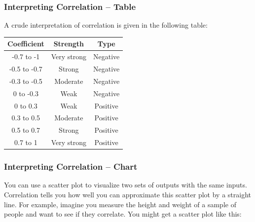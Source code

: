 \documentclass[aspectratio=169,11pt,svgnames,handout]{beamer}
\begin{document}
\begin{frame}
 \frametitle{Interpreting Correlation -- Table}
 A crude interpretation of correlation is given in the following table:
 \begin{center}
  \begin{tabular}{ccc}
   \textbf{Coefficient} & \textbf{Strength} & \textbf{Type} \\
   \toprule
   -0.7 to -1 & Very strong & Negative\\
   -0.5 to -0.7 & Strong & Negative\\
   -0.3 to -0.5 & Moderate & Negative\\
   0 to -0.3 & Weak & Negative\\
   0 to 0.3 & Weak & Positive\\
   0.3 to 0.5 & Moderate & Positive\\
   0.5 to 0.7 & Strong & Positive\\
   0.7 to 1 & Very strong & Positive
  \end{tabular}
 \end{center}
\end{frame}

\begin{frame}
 \frametitle{Interpreting Correlation -- Chart}
 You can use a scatter plot to visualize two sets of outputs with the same
 inputs.
 \pause
 Correlation tells you \alert{how well you can approximate} this scatter plot by
 a straight line.
 \pause
 For example, imagine you measure the height and weight of a sample of people
 and want to see if they correlate. You might get a scatter plot like this:
 \pause
 \begin{center}
 \end{center}
\end{frame}
\end{document}
